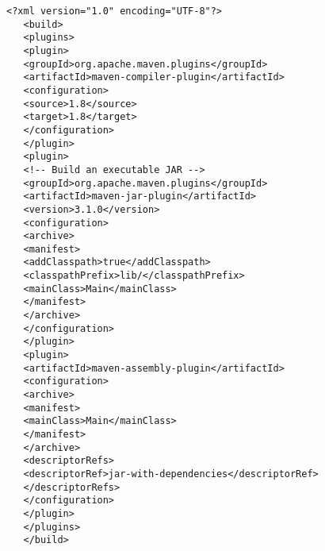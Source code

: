 \begin{latin}
	\begin{lstlisting}[language=x]
   <?xml version="1.0" encoding="UTF-8"?>
   <build>
   <plugins>
   <plugin>
   <groupId>org.apache.maven.plugins</groupId>
   <artifactId>maven-compiler-plugin</artifactId>
   <configuration>
   <source>1.8</source>
   <target>1.8</target>
   </configuration>
   </plugin>
   <plugin>
   <!-- Build an executable JAR -->
   <groupId>org.apache.maven.plugins</groupId>
   <artifactId>maven-jar-plugin</artifactId>
   <version>3.1.0</version>
   <configuration>
   <archive>
   <manifest>
   <addClasspath>true</addClasspath>
   <classpathPrefix>lib/</classpathPrefix>
   <mainClass>Main</mainClass>
   </manifest>
   </archive>
   </configuration>
   </plugin>
   <plugin>
   <artifactId>maven-assembly-plugin</artifactId>
   <configuration>
   <archive>
   <manifest>
   <mainClass>Main</mainClass>
   </manifest>
   </archive>
   <descriptorRefs>
   <descriptorRef>jar-with-dependencies</descriptorRef>
   </descriptorRefs>
   </configuration>
   </plugin>
   </plugins>
   </build>
\end{lstlisting}
\end{latin}
\label{code:pom}

